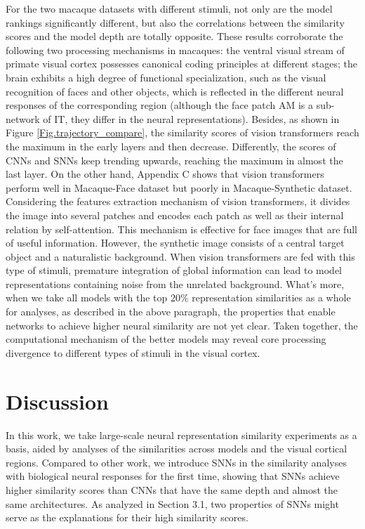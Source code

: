 \documentclass[letterpaper]{article} %
\begin{document}
For the two macaque datasets with different stimuli, not only are the model rankings significantly different, but also the correlations between the similarity scores and the model depth are totally opposite. These results corroborate the following two processing mechanisms in macaques: the ventral visual stream of primate visual cortex possesses canonical coding principles at different stages; the brain exhibits a high degree of functional specialization, such as the visual recognition of faces and other objects, which is reflected in the different neural responses of the corresponding region (although the face patch AM is a sub-network of IT, they differ in the neural representations). Besides, as shown in Figure \ref{Fig.trajectory_compare}, the similarity scores of vision transformers reach the maximum in the early layers and then decrease. Differently, the scores of CNNs and SNNs keep trending upwards, reaching the maximum in almost the last layer. On the other hand, Appendix C shows that vision transformers perform well in Macaque-Face dataset but poorly in Macaque-Synthetic dataset. Considering the features extraction mechanism of vision transformers, it divides the image into several patches and encodes each patch as well as their internal relation by self-attention. This mechanism is effective for face images that are full of useful information. However, the synthetic image consists of a central target object and a naturalistic background. When vision transformers are fed with this type of stimuli, premature integration of global information can lead to model representations containing noise from the unrelated background. What's more, when we take all models with the top 20\% representation similarities as a whole for analyses, as described in the above paragraph, the properties that enable networks to achieve higher neural similarity are not yet clear. Taken together, the computational mechanism of the better models may reveal core processing divergence to different types of stimuli in the visual cortex.

\section{Discussion}

In this work, we take large-scale neural representation similarity experiments as a basis, aided by analyses of the similarities across models and the visual cortical regions. Compared to other work, we introduce SNNs in the similarity analyses with biological neural responses for the first time, showing that SNNs achieve higher similarity scores than CNNs that have the same depth and almost the same architectures. As analyzed in Section 3.1, two properties of SNNs might serve as the explanations for their high similarity scores. 
\end{document}
